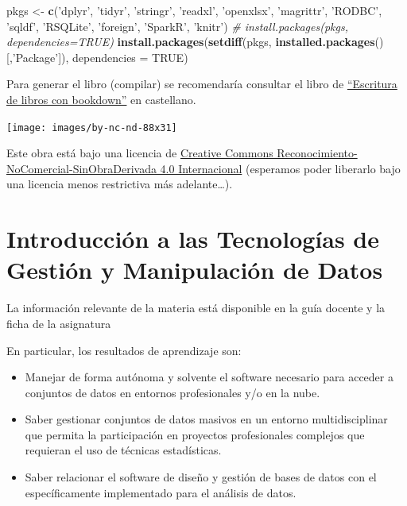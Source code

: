 \documentclass[]{book}
\newenvironment{Shaded}{\begin{snugshade}}{\end{snugshade}}
\newcommand{\KeywordTok}[1]{\textcolor[rgb]{0.13,0.29,0.53}{\textbf{#1}}}
\newcommand{\DataTypeTok}[1]{\textcolor[rgb]{0.13,0.29,0.53}{#1}}
\newcommand{\StringTok}[1]{\textcolor[rgb]{0.31,0.60,0.02}{#1}}
\newcommand{\CommentTok}[1]{\textcolor[rgb]{0.56,0.35,0.01}{\textit{#1}}}
\newcommand{\OtherTok}[1]{\textcolor[rgb]{0.56,0.35,0.01}{#1}}
\newcommand{\NormalTok}[1]{#1}
\begin{document}
\begin{Shaded}
\begin{Highlighting}[]
\NormalTok{pkgs <-}\StringTok{ }\KeywordTok{c}\NormalTok{(}\StringTok{'dplyr'}\NormalTok{, }\StringTok{'tidyr'}\NormalTok{, }\StringTok{'stringr'}\NormalTok{, }\StringTok{'readxl'}\NormalTok{, }\StringTok{'openxlsx'}\NormalTok{, }\StringTok{'magrittr'}\NormalTok{, }
          \StringTok{'RODBC'}\NormalTok{, }\StringTok{'sqldf'}\NormalTok{, }\StringTok{'RSQLite'}\NormalTok{, }\StringTok{'foreign'}\NormalTok{, }\StringTok{'SparkR'}\NormalTok{, }\StringTok{'knitr'}\NormalTok{)}
\CommentTok{# install.packages(pkgs, dependencies=TRUE)}
\KeywordTok{install.packages}\NormalTok{(}\KeywordTok{setdiff}\NormalTok{(pkgs, }\KeywordTok{installed.packages}\NormalTok{()[,}\StringTok{'Package'}\NormalTok{]), }\DataTypeTok{dependencies =} \OtherTok{TRUE}\NormalTok{)}
\end{Highlighting}
\end{Shaded}

Para generar el libro (compilar) se recomendaría consultar el libro de
\href{https://rubenfcasal.github.io/bookdown_intro}{``Escritura de
libros con bookdown''} en castellano.

\texttt{[image: images/by-nc-nd-88x31]}

Este obra está bajo una licencia de
\href{https://creativecommons.org/licenses/by-nc-nd/4.0/deed.es_ES}{Creative
Commons Reconocimiento-NoComercial-SinObraDerivada 4.0 Internacional}
(esperamos poder liberarlo bajo una licencia menos restrictiva más
adelante\ldots{}).

\chapter{Introducción a las Tecnologías de Gestión y Manipulación de
Datos}\label{introducciuxf3n-a-las-tecnologuxedas-de-gestiuxf3n-y-manipulaciuxf3n-de-datos}

La información relevante de la materia está disponible en la guía
docente y la ficha de la asignatura

En particular, los resultados de aprendizaje son:

\begin{itemize}
\item
  Manejar de forma autónoma y solvente el software necesario para
  acceder a conjuntos de datos en entornos profesionales y/o en la nube.
\item
  Saber gestionar conjuntos de datos masivos en un entorno
  multidisciplinar que permita la participación en proyectos
  profesionales complejos que requieran el uso de técnicas estadísticas.
\item
  Saber relacionar el software de diseño y gestión de bases de datos con
  el específicamente implementado para el análisis de datos.
\end{itemize}
\end{document}
